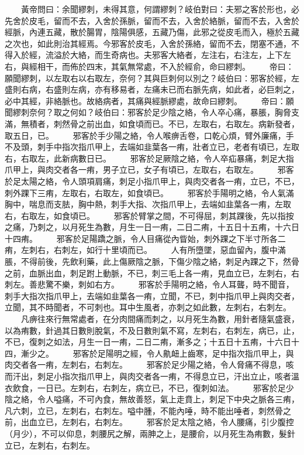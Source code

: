 　　黃帝問曰：余聞繆刺，未得其意，何謂繆刺？岐伯對曰：夫邪之客於形也，必先舍於皮毛，留而不去，入舍於孫脈，留而不去，入舍於絡脈，留而不去，入舍於經脈，內連五藏，散於腸胃，陰陽俱感，五藏乃傷，此邪之從皮毛而入，極於五藏之次也，如此則治其經焉。今邪客於皮毛，入舍於孫絡，留而不去，閉塞不通，不得入於經，流溢於大絡，而生奇病也。夫邪客大絡者，左注右，右注左，上下左右，與經相干，而佈於四末，其氣無常處，不入於經俞，命曰繆刺。
　　帝曰：願聞繆刺，以左取右以右取左，奈何？其與巨刺何以別之？岐伯曰：邪客於經，左盛則右病，右盛則左病，亦有移易者，左痛未已而右脈先病，如此者，必巨刺之，必中其經，非絡脈也。故絡病者，其痛與經脈繆處，故命曰繆刺。
　　帝曰：願聞繆刺奈何？取之何如？岐伯曰：邪客於足少陰之絡，令人卒心痛，暴脹，胸脅支滿，無積者，刺然骨之前出血，如食頃而已。不已，左取右，右取左。病新發者，取五日，已。
　　邪客於手少陽之絡，令人喉痹舌卷，口乾心煩，臂外廉痛，手不及頭，刺手中指次指爪甲上，去端如韭葉各一痏，壯者立已，老者有頃已，左取右，右取左，此新病數日已。
　　邪客於足厥陰之絡，令人卒疝暴痛，刺足大指爪甲上，與肉交者各一痏，男子立已，女子有頃已，左取右，右取左。
　　邪客於足太陽之絡，令人頭項肩痛，刺足小指爪甲上，與肉交者各一痏，立已，不已，刺外踝下三痏，左取右，右取左，如食頃已。
　　邪客於手陽明之絡，令人氣滿胸中，喘息而支胠，胸中熱，刺手大指、次指爪甲上，去端如韭葉各一痏，左取右，右取左，如食頃已。
　　邪客於臂掌之間，不可得屈，刺其踝後，先以指按之痛，乃刺之，以月死生為數，月生一日一痏，二日二痏，十五日十五痏，十六日十四痏。
　　邪客於足陽蹻之脈，令人目痛從內眥始，刺外踝之下半寸所各二痏，左刺右，右刺左，如行十里頃而已。
　　人有所墮墜，惡血留內，腹中滿脹，不得前後，先飲利藥，此上傷厥陰之脈，下傷少陰之絡，刺足內踝之下，然骨之前，血脈出血，刺足跗上動脈，不已，刺三毛上各一痏，見血立已，左刺右，右刺左。善悲驚不樂，刺如右方。
　　邪客於手陽明之絡，令人耳聾，時不聞音，刺手大指次指爪甲上，去端如韭葉各一痏，立聞，不已，刺中指爪甲上與肉交者，立聞，其不時聞者，不可刺也。耳中生風者，亦刺之如此數，左刺右，右刺左。
　　凡痹往來行無常處者，在分肉間痛而刺之，以月死生為數，用針者隨氣盛衰，以為痏數，針過其日數則脫氣，不及日數則氣不寫，左刺右，右刺左，病已，止，不已，復刺之如法，月生一日一痏，二日二痏，漸多之；十五日十五痏，十六日十四，漸少之。
　　邪客於足陽明之經，令人鼽衄上齒寒，足中指次指爪甲上，與肉交者各一痏，左刺右，右刺左。
　　邪客於足少陽之絡，令人脅痛不得息，咳而汗出，刺足小指次指爪甲上，與肉交者各一痏，不得息立已，汗出立止，咳者溫衣飲食，一日已。左刺右，右刺左，病立已，不已，復刺如法。
　　邪客於足少陰之絡，令人嗌痛，不可內食，無故善怒，氣上走賁上，刺足下中央之脈各三痏，凡六刺，立已，左刺右，右刺左。嗌中腫，不能內唾，時不能出唾者，刺然骨之前，出血立已，左刺右，右刺左。
　　邪客於足太陰之絡，令人腰痛，引少腹控（月少），不可以仰息，刺腰尻之解，兩胂之上，是腰俞，以月死生為痏數，髮針立已，左刺右，右刺左。
